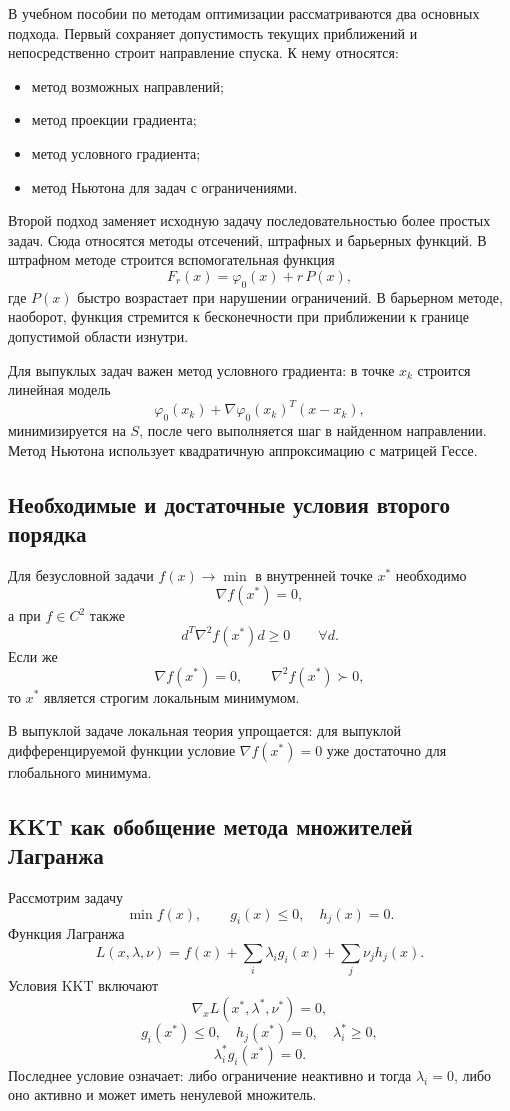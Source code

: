 В учебном пособии по методам оптимизации рассматриваются два основных подхода.
Первый сохраняет допустимость текущих приближений и непосредственно строит
направление спуска. К нему относятся:
\begin{itemize}
    \item метод возможных направлений;
    \item метод проекции градиента;
    \item метод условного градиента;
    \item метод Ньютона для задач с ограничениями.
\end{itemize}

Второй подход заменяет исходную задачу последовательностью более простых задач.
Сюда относятся методы отсечений, штрафных и барьерных функций. В штрафном методе
строится вспомогательная функция
\[
    F_r(x)=\varphi_0(x)+r\,P(x),
\]
где $P(x)$ быстро возрастает при нарушении ограничений. В барьерном методе,
наоборот, функция стремится к бесконечности при приближении к границе допустимой
области изнутри.

Для выпуклых задач важен метод условного градиента: в точке $x_k$ строится
линейная модель
\[
    \varphi_0(x_k)+\nabla\varphi_0(x_k)^T(x-x_k),
\]
минимизируется на $S$, после чего выполняется шаг в найденном направлении. Метод
Ньютона использует квадратичную аппроксимацию с матрицей Гессе.


\subsection{Необходимые и достаточные условия второго порядка}

Для безусловной задачи $f(x)\to\min$ в внутренней точке $x^*$ необходимо
\[
    \nabla f(x^*)=0,
\]
а при $f\in C^2$ также
\[
    d^T\nabla^2f(x^*)d\ge0\qquad \forall d.
\]
Если же
\[
    \nabla f(x^*)=0,
    \qquad
    \nabla^2f(x^*)\succ0,
\]
то $x^*$ является строгим локальным минимумом.

В выпуклой задаче локальная теория упрощается: для выпуклой дифференцируемой
функции условие $\nabla f(x^*)=0$ уже достаточно для глобального минимума.

\subsection{KKT как обобщение метода множителей Лагранжа}

Рассмотрим задачу
\[
\min f(x),\qquad g_i(x)\le0,\quad h_j(x)=0.
\]
Функция Лагранжа
\[
L(x,\lambda,\nu)=f(x)+\sum_i\lambda_i g_i(x)+\sum_j\nu_j h_j(x).
\]
Условия KKT включают
\[
\nabla_xL(x^*,\lambda^*,\nu^*)=0,
\]
\[
g_i(x^*)\le0,\quad h_j(x^*)=0,\quad \lambda_i^*\ge0,
\]
\[
\lambda_i^*g_i(x^*)=0.
\]
Последнее условие означает: либо ограничение неактивно и тогда $\lambda_i=0$,
либо оно активно и может иметь ненулевой множитель.


